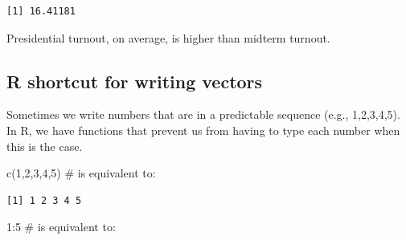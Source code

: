 \documentclass[
  letterpaper,
  DIV=11,
  numbers=noendperiod]{scrreprt}
\newenvironment{Shaded}{\begin{snugshade}}{\end{snugshade}}
\newcommand{\CommentTok}[1]{\textcolor[rgb]{0.37,0.37,0.37}{#1}}
\newcommand{\DecValTok}[1]{\textcolor[rgb]{0.68,0.00,0.00}{#1}}
\newcommand{\FunctionTok}[1]{\textcolor[rgb]{0.28,0.35,0.67}{#1}}
\newcommand{\NormalTok}[1]{\textcolor[rgb]{0.00,0.23,0.31}{#1}}
\newcommand{\OtherTok}[1]{\textcolor[rgb]{0.00,0.23,0.31}{#1}}
\newcommand{\SpecialCharTok}[1]{\textcolor[rgb]{0.37,0.37,0.37}{#1}}
\begin{document}
\begin{Shaded}
\end{Shaded}

\begin{verbatim}
[1] 16.41181
\end{verbatim}

Presidential turnout, on average, is higher than midterm turnout.

\hypertarget{r-shortcut-for-writing-vectors}{%
\subsection{R shortcut for writing
vectors}\label{r-shortcut-for-writing-vectors}}

Sometimes we write numbers that are in a predictable sequence (e.g.,
1,2,3,4,5). In R, we have functions that prevent us from having to type
each number when this is the case.

\begin{Shaded}
\begin{Highlighting}[]
\FunctionTok{c}\NormalTok{(}\DecValTok{1}\NormalTok{,}\DecValTok{2}\NormalTok{,}\DecValTok{3}\NormalTok{,}\DecValTok{4}\NormalTok{,}\DecValTok{5}\NormalTok{) }\CommentTok{\# is equivalent to:}
\end{Highlighting}
\end{Shaded}

\begin{verbatim}
[1] 1 2 3 4 5
\end{verbatim}

\begin{Shaded}
\begin{Highlighting}[]
\DecValTok{1}\SpecialCharTok{:}\DecValTok{5} \CommentTok{\# is equivalent to:}
\end{Highlighting}
\end{Shaded}
\end{document}
